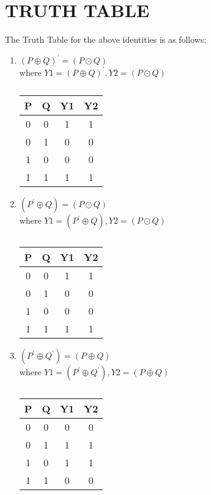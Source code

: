 \documentclass[a4paper,11pt,twocolumn]{article}
\begin{document}
\section{TRUTH TABLE}
The Truth Table for the above identities is as follows:
\begin{enumerate}[label=\textbf{(\Alph*})]
	\item \textbf{$ (P\oplus Q)^{\prime} = (P\odot Q)$} \\
where $Y1=(P\oplus Q)^{\prime}, Y2=(P\odot Q)$\\
\bigskip
\begin{table}[ht!]
	\centering
\begin{tabular}{ |c |c |c |c |} 
\hline 
\newline 
	\textbf{P} & \textbf{Q} & \textbf{Y1} & \textbf{Y2} \\ 
\hline
	0 & 0 &1 &1\\   
	0 & 1 &0 &0\\  
	1 & 0 &0 &0\\  
	1 & 1 &1 &1\\  
\hline 
\end{tabular}
	\caption{}
\end{table}
\bigskip
\bigskip

	\item \textbf{$(P^{\prime}\oplus Q)=(P\odot Q)$}\\
where $Y1=(P^{\prime}\oplus Q), Y2=(P\odot Q)$\\
\bigskip
\begin{table}[ht!]
	\centering
\begin{tabular}{ |c |c |c |c |} 
\hline 
\newline 
	\textbf{P} & \textbf{Q} & \textbf{Y1} & \textbf{Y2}\\
\hline  
	0 & 0 &1 &1\\   
	0 & 1 &0 &0\\ 
	1 & 0 &0 &0\\  
	1 & 1 &1 &1\\
\hline 
\end{tabular}
\caption{}
\end{table}
\bigskip


\item \textbf{$(P^{\prime}\oplus Q^{\prime}) = (P\oplus Q)$} \\ where $Y1=(P^{\prime}\oplus Q^{\prime}), Y2=(P\oplus Q)$\\
\bigskip
\begin{table}[h]
	\centering
\begin{tabular}{ |c |c |c |c |} 
\hline 
\newline 
\textbf{P} & \textbf{Q} & \textbf{Y1} & \textbf{Y2}\\ 
\hline 
	0 & 0 &0 &0\\   
	0 & 1 &1 &1\\  
	1 & 0 &1 &1\\
	1 & 1 &0 &0\\
 \hline 
 \end{tabular}
	\caption{}
\end{table}


\end{enumerate}
\end{document}
